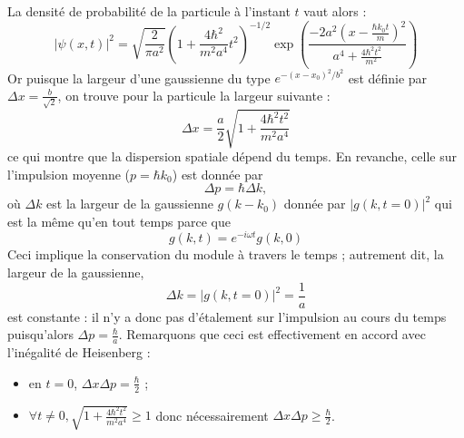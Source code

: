 \documentclass{book}
\begin{document}
La densité de probabilité de la particule à l'instant $t$ vaut alors : 
\begin{equation}
  \left| \psi(x,t) \right| ^2 = \sqrt{\frac{2}{\pi a^2}} \left( 1 + \frac{4\hbar^2}{m^2 a^4}t^2 \right) ^{-1/2} \exp \left( \frac{-2a^2 (x-\frac{\hbar k_0 t}{m})^2}{a^4 + \frac{4\hbar^2 t^2}{m^2}} \right)
\end{equation}
Or puisque la largeur d'une gaussienne du type $e^{-(x - x_0)^2/b^2}$ est définie par $\Delta x = \frac{b}{\sqrt{2}}$, on trouve pour la particule la largeur suivante : 
\begin{equation}
\Delta x = \dfrac{a}{2} \sqrt{ 1 + \dfrac{4 \hbar ^2 t^2}{m^2 a^4}}
\end{equation}
ce qui montre que la dispersion spatiale dépend du temps. En revanche, celle sur l'impulsion moyenne ($p = \hbar k_0$) est donnée par $$\Delta p = \hbar \Delta k,$$ où $\Delta k$ est la largeur de la gaussienne $g(k-k_0)$ donnée par $|g(k,t=0)|^2$ qui est la même qu'en tout temps parce que $$g(k,t) = e^{-i\omega t} g(k,0)$$ 
Ceci implique la conservation du module à travers le temps ; autrement dit, la largeur de la gaussienne, 
$$\Delta k = |g(k,t=0)|^2 = \dfrac{1}{a}$$
est constante : il n'y a donc pas d'étalement sur l'impulsion au cours du temps puisqu'alors $\Delta p = \frac{\hbar}{a}$.
Remarquons que ceci est effectivement en accord avec l'inégalité de Heisenberg : 
\begin{itemize}
  \item en $t=0$, $\Delta x \Delta p = \frac{\hbar}{2}$ ; 
  \item $\forall t \ne 0, \sqrt{1 + \frac{4\hbar^2 t^2}{m^2 a^4}} \ge 1$ donc nécessairement $\Delta x \Delta p \ge \frac{\hbar}{2}$. 
\end{itemize}
\end{document}

